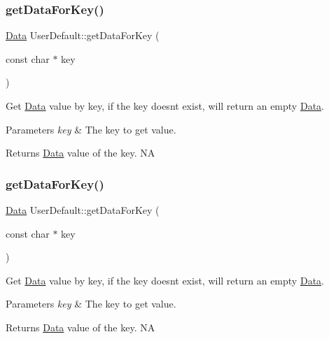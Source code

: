 \subsubsection{\texorpdfstring{get\+Data\+For\+Key()}{getDataForKey()}\hspace{0.1cm}{\footnotesize\ttfamily [1/4]}}
{\footnotesize\ttfamily \hyperlink{classData}{Data} User\+Default\+::get\+Data\+For\+Key (\begin{DoxyParamCaption}\item[{const char $\ast$}]{key }\end{DoxyParamCaption})}

Get \hyperlink{classData}{Data} value by key, if the key doesn\textquotesingle{}t exist, will return an empty \hyperlink{classData}{Data}. 
\begin{DoxyParams}{Parameters}
{\em key} & The key to get value. \\
\hline
\end{DoxyParams}
\begin{DoxyReturn}{Returns}
\hyperlink{classData}{Data} value of the key.  NA 
\end{DoxyReturn}
\mbox{\label{classUserDefault_aa01598193b5ee7c6db0b53e02297d44d}} 
\subsubsection{\texorpdfstring{get\+Data\+For\+Key()}{getDataForKey()}\hspace{0.1cm}{\footnotesize\ttfamily [2/4]}}
{\footnotesize\ttfamily \hyperlink{classData}{Data} User\+Default\+::get\+Data\+For\+Key (\begin{DoxyParamCaption}\item[{const char $\ast$}]{key }\end{DoxyParamCaption})}

Get \hyperlink{classData}{Data} value by key, if the key doesn\textquotesingle{}t exist, will return an empty \hyperlink{classData}{Data}. 
\begin{DoxyParams}{Parameters}
{\em key} & The key to get value. \\
\hline
\end{DoxyParams}
\begin{DoxyReturn}{Returns}
\hyperlink{classData}{Data} value of the key.  NA 
\end{DoxyReturn}
\mbox{\label{classUserDefault_a1b0e4faf809d850546fab10a2fea9770}} 
